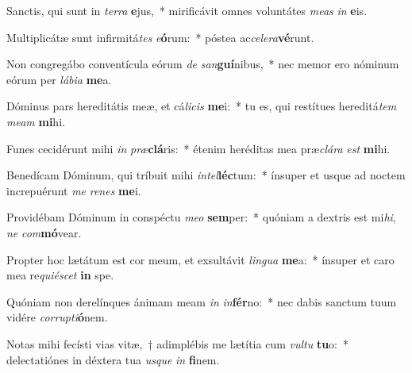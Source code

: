 \item Sanctis, qui sunt in \textit{ter}\textit{ra} \textbf{e}jus,~* mirificávit omnes voluntátes \textit{me}\textit{as} \textit{in} \textbf{e}is.
\item Multiplicátæ sunt infirmitá\textit{tes} \textit{e}\textbf{ó}rum:~* póstea ac\textit{ce}\textit{le}\textit{ra}\textbf{vé}runt.
\item Non congregábo conventícula eórum \textit{de} \textit{san}\textbf{guí}nibus,~* nec memor ero nóminum eórum per \textit{lá}\textit{bi}\textit{a} \textbf{me}a.
\item Dóminus pars hereditátis meæ, et cá\textit{li}\textit{cis} \textbf{me}i:~* tu es, qui restítues hereditá\textit{tem} \textit{me}\textit{am} \textbf{mi}hi.
\item Funes cecidérunt mihi \textit{in} \textit{præ}\textbf{clá}ris:~* étenim heréditas mea præ\textit{clá}\textit{ra} \textit{est} \textbf{mi}hi.
\item Benedícam Dóminum, qui tríbuit mihi \textit{in}\textit{tel}\textbf{léc}tum:~* ínsuper et usque ad noctem increpuérunt \textit{me} \textit{re}\textit{nes} \textbf{me}i.
\item Providébam Dóminum in conspéctu \textit{me}\textit{o} \textbf{sem}per:~* quóniam a dextris est mi\textit{hi}, \textit{ne} \textit{com}\textbf{mó}vear.
\item Propter hoc lætátum est cor meum, et exsultávit \textit{lin}\textit{gua} \textbf{me}a:~* ínsuper et caro mea re\textit{qui}\textit{é}\textit{scet} \textbf{in} spe.
\item Quóniam non derelínques ánimam meam \textit{in} \textit{in}\textbf{fér}no:~* nec dabis sanctum tuum vidére \textit{cor}\textit{rup}\textit{ti}\textbf{ó}nem.
\item Notas mihi fecísti vias vitæ,~† adimplébis me lætítia cum \textit{vul}\textit{tu} \textbf{tu}o:~* delectatiónes in déxtera tua \textit{us}\textit{que} \textit{in} \textbf{fi}nem.

